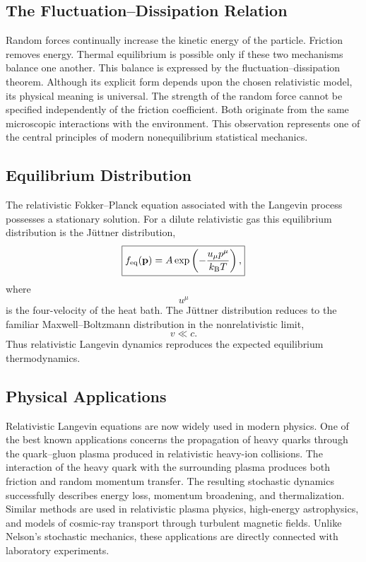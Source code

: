 \subsection{The Fluctuation--Dissipation Relation}
Random forces continually increase the kinetic energy of the particle.
Friction removes energy.
Thermal equilibrium is possible only if these two mechanisms balance one
another.
This balance is expressed by the
fluctuation--dissipation theorem.
Although its explicit form depends upon the chosen relativistic model,
its physical meaning is universal.
The strength of the random force cannot be specified independently of
the friction coefficient.
Both originate from the same microscopic interactions with the
environment.
This observation represents one of the central principles of modern
nonequilibrium statistical mechanics.
\subsection{Equilibrium Distribution}
The relativistic Fokker--Planck equation associated with the Langevin
process possesses a stationary solution.
For a dilute relativistic gas this equilibrium distribution is the
Jüttner distribution,
\begin{equation}
\boxed{f_{\rm eq}(\mathbf p)=A\exp\left(-\frac{u_\mu p^\mu}{k_{\rm B}T}\right),}
\label{eq:Juttner}
\end{equation}
where
\[u^\mu\]
is the four-velocity of the heat bath.
The Jüttner distribution reduces to the familiar Maxwell--Boltzmann
distribution in the nonrelativistic limit,
\[v\ll c.\]
Thus relativistic Langevin dynamics reproduces the expected equilibrium
thermodynamics.
\subsection{Physical Applications}
Relativistic Langevin equations are now widely used in modern physics.
One of the best known applications concerns the propagation of heavy
quarks through the quark--gluon plasma produced in relativistic
heavy-ion collisions.
The interaction of the heavy quark with the surrounding plasma produces
both friction and random momentum transfer.
The resulting stochastic dynamics successfully describes energy loss,
momentum broadening, and thermalization.
Similar methods are used in relativistic plasma physics,
high-energy astrophysics,
and models of cosmic-ray transport through turbulent magnetic fields.
Unlike Nelson's stochastic mechanics, these applications are directly
connected with laboratory experiments.
